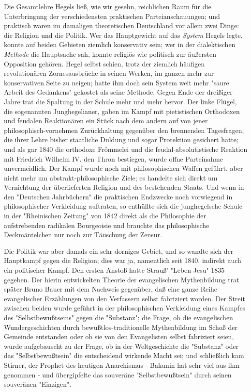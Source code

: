 Die Gesamtlehre Hegels ließ, wie wir gesehn, reichlichen Raum
für die Unterbringung der verschiedensten praktischen
Parteianschauungen; und praktisch waren im damaligen theoretischen
Deutschland vor allem zwei Dinge: die Religion und die Politik. Wer das
Hauptgewicht auf das \emph{System} Hegels legte, konnte auf beiden
Gebieten ziemlich konservativ sein; wer in der
dialektischen \emph{Methode} die Hauptsache sah, konnte religiös wie
politisch zur äußersten Opposition gehören. Hegel selbst schien, trotz
der ziemlich häufigen revolutionären Zornesausbrüche in seinen Werken,
im ganzen mehr zur konservativen Seite zu neigen; hatte ihm doch sein
System weit mehr "saure Arbeit des Gedankens" gekostet als seine
Methode. Gegen Ende der dreißiger Jahre trat die Spaltung in der Schule
mehr und mehr hervor. Der linke Flügel, die sogenannten Junghegelianer,
gaben im Kampf mit pietistischen Orthodoxen und feudalen Reaktionären
ein Stück nach dem andern auf von jener philosophisch-vornehmen
Zurückhaltung gegenüber den brennenden Tagesfragen, die ihrer Lehre
bisher staatliche Duldung und sogar Protektion gesichert hatte; und als
gar 1840 die orthodoxe Frömmelei und die feudal-absolutistische Reaktion
mit Friedrich Wilhelm IV. den Thron bestiegen, wurde offne Parteinahme
unvermeidlich. Der Kampf wurde noch mit philosophischen Waffen geführt,
aber nicht mehr um abstrakt-philosophische Ziele; es handelte sich
direkt um Vernichtung der überlieferten Religion und des bestehenden
Staats. Und wenn in den "Deutschen Jahrbüchern" die praktischen
Endzwecke noch vorwiegend in philosophischer Verkleidung auftraten, so
enthüllte sich die junghegelsche Schule in der "Rheinischen Zeitung" von
1842 direkt als die Philosophie der aufstrebenden radikalen Bourgeoisie
und brauchte das philosophische Deckmäntelchen nur noch zur Täuschung
der Zensur.

Die Politik war aber damals ein sehr dorniges Gebiet, und so
wandte sich der Hauptkampf gegen die Religion; dies war ja, namentlich
seit 1840, indirekt auch ein politischer Kampf. Den ersten Anstoß hatte
Strauß' "Leben Jesu" 1835 gegeben. Der hierin entwickelten Theorie der
evangelischen Mythenbildung trat später Bruno Bauer mit dem Nachweis
gegenüber, daß eine ganze Reihe evangelischer Erzählungen von den
Verfassern selbst fabriziert worden. Der Streit zwischen beiden wurde
geführt in der philosophischen Verkleidung eines Kampfes des
"Selbstbewußtseins" gegen die "Substanz"; die Frage, ob die
evangelischen Wundergeschichten durch bewußtlos-traditionelle
Mythenbildung im Schoß der Gemeinde entstanden oder ob sie von den
Evangelisten selbst fabriziert seien, wurde aufgebauscht zu der Frage,
ob in der Weltgeschichte die "Substanz" oder das "Selbstbewußtsein" die
entscheidend wirkende Macht sei; und schließlich kam Stirner, der
Prophet des heutigen Anarchismus - Bakunin hat sehr viel aus ihm
genommen - und übergipfelte das souveräne "Selbstbewußtsein" durch
seinen souveränen "Einzigen".

